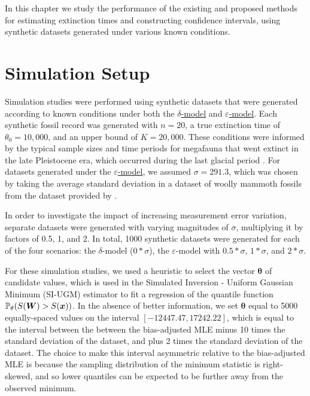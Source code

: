 
In this chapter we study the performance of the existing and proposed methods for estimating extinction times and constructing confidence intervals, using synthetic datasets generated under various known conditions.

\section{Simulation Setup}

Simulation studies were performed using synthetic datasets that were generated according to known conditions under both the \hyperref[model: no-measurement-error]{$\delta$-model} and \hyperref[model: measurement-error]{$\varepsilon$-model}. Each synthetic fossil record was generated with $n=20$, a true extinction time of $\theta_0 = 10,000$, and an upper bound of $K = 20,000$. These conditions were informed by the typical sample sizes and time periods for megafauna that went extinct in the late Pleistocene era, which occurred during the last glacial period \cite{Cooper2015}. For datasets generated under the \hyperref[model: measurement-error]{$\varepsilon$-model}, we assumed $\sigma = 291.3$, which was chosen by taking the average standard deviation in a dataset of woolly mammoth fossils from the dataset provided by \citet{Cooper2015}.

In order to investigate the impact of increasing measurement error variation, separate datasets were generated with varying magnitudes of $\sigma$, multiplying it by factors of 0.5, 1, and 2. In total, 1000 synthetic datasets were generated for each of the four scenarios: the $\delta$-model ($0*\sigma$), the $\varepsilon$-model with $0.5*\sigma$, $1*\sigma$, and $2*\sigma$. 

For these simulation studies, we used a heuristic to select the vector $\bm{\theta}$ of candidate values, which is used in the Simulated Inversion - Uniform Gaussian Minimum (SI-UGM) estimator to fit a regression of the quantile function $\mathbb{P}_\theta (S(\bm{W}) > S(\bm{x}))$. In the absence of better information, we set $\bm{\theta}$ equal to 5000 equally-spaced values on the interval $[-12447.47 , 17242.22]$, which is equal to the interval between the between the bias-adjusted MLE minus 10 times the standard deviation of the dataset, and plus 2 times the standard deviation of the dataset. The choice to make this interval asymmetric relative to the bias-adjusted MLE is because the sampling distribution of the minimum statistic is right-skewed, and so lower quantiles can be expected to be further away from the observed minimum.

